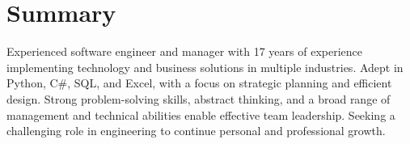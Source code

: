 \section*{Summary}

Experienced software engineer and manager with 17 years of experience implementing technology and business solutions in multiple industries. Adept in Python, C\#, SQL, and Excel, with a focus on strategic planning and efficient design. Strong problem-solving skills, abstract thinking, and a broad range of management and technical abilities enable effective team leadership. Seeking a challenging role in engineering to continue personal and professional growth.
